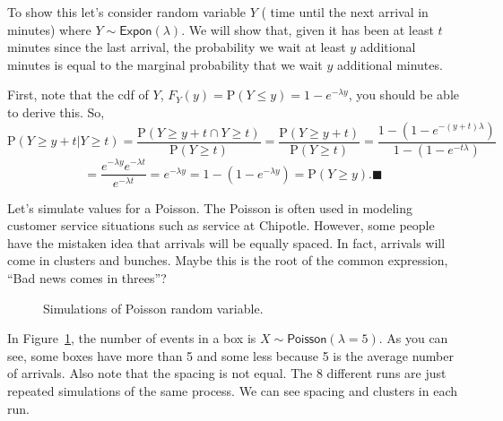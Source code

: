 \documentclass[
  letterpaper,
  DIV=11,
  numbers=noendperiod]{scrreprt}
\begin{document}
To show this let's consider random variable \(Y\) ( time until the next
arrival in minutes) where \(Y\sim\textsf{Expon}(\lambda)\). We will show
that, given it has been at least \(t\) minutes since the last arrival,
the probability we wait at least \(y\) additional minutes is equal to
the marginal probability that we wait \(y\) additional minutes.

First, note that the cdf of \(Y\),
\(F_Y(y)=\mbox{P}(Y\leq y)=1-e^{-\lambda y}\), you should be able to
derive this. So, \[
\mbox{P}(Y\geq y+t|Y\geq t) = \frac{\mbox{P}(Y\geq y+t \cap Y\geq t)}{\mbox{P}(Y\geq t)}=\frac{\mbox{P}(Y\geq y +t)}{\mbox{P}(Y\geq t)} = \frac{1-(1-e^{-(y+t)\lambda})}{1-(1-e^{-t\lambda})}
\] \[
=\frac{e^{-\lambda y }e^{-\lambda t}}{e^{-\lambda t }}=e^{-\lambda y} = 1-(1-e^{-\lambda y})=\mbox{P}(Y\geq y). 
\blacksquare
\]

Let's simulate values for a Poisson. The Poisson is often used in
modeling customer service situations such as service at Chipotle.
However, some people have the mistaken idea that arrivals will be
equally spaced. In fact, arrivals will come in clusters and bunches.
Maybe this is the root of the common expression, ``Bad news comes in
threes''?

\begin{figure}


\caption{\label{fig-sim}Simulations of Poisson random variable.}

\end{figure}%

In Figure~\ref{fig-sim}, the number of events in a box is
\(X\sim \textsf{Poisson}(\lambda = 5)\). As you can see, some boxes have
more than 5 and some less because 5 is the average number of arrivals.
Also note that the spacing is not equal. The 8 different runs are just
repeated simulations of the same process. We can see spacing and
clusters in each run.
\end{document}
